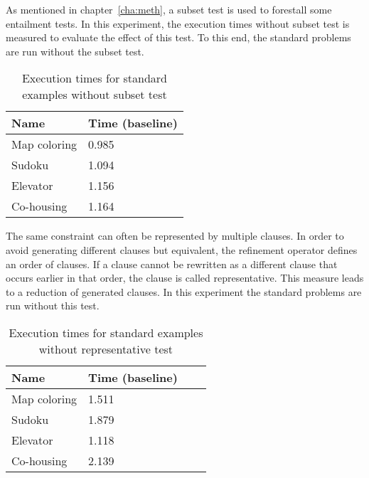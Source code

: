 \begin{experiment}
	As mentioned in chapter~\ref{cha:meth}, a subset test is used to forestall some entailment tests.
	In this experiment, the execution times without subset test is measured to evaluate the effect of this test.
	To this end, the standard problems are run without the subset test.

	\begin{table}[!htp]
		\begin{tabularx}{\textwidth}{XX}
		\textbf{Name}	& \textbf{Time (baseline)} \\
		\toprule
		Map coloring 	& 0.985 \\
		Sudoku 			& 1.094 \\
		Elevator 		& 1.156 \\
		Co-housing 		& 1.164
		\end{tabularx}
		\caption{Execution times for standard examples without subset test}
		\label{tbl:exp_speed_no_subset}
	\end{table}
\end{experiment}

\begin{experiment}
	The same constraint can often be represented by multiple clauses.
	In order to avoid generating different clauses but equivalent, the refinement operator defines an order of clauses.
	If a clause cannot be rewritten as a different clause that occurs earlier in that order, the clause is called representative.
	This measure leads to a reduction of generated clauses.
	In this experiment the standard problems are run without this test.

	\begin{table}[!htp]
		\begin{tabularx}{\textwidth}{XXXX}
		\textbf{Name}	& \textbf{Time (baseline)} \\
		\toprule
		Map coloring 	& 1.511	\\
		Sudoku 			& 1.879	\\
		Elevator 		& 1.118	\\
		Co-housing 		& 2.139	
		\end{tabularx}
		\caption{Execution times for standard examples without representative test}
		\label{tbl:exp_speed_no_representative}
	\end{table}

\end{experiment}

